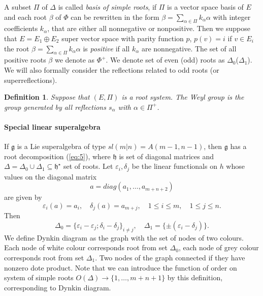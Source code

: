 \documentclass[english]{elsarticle}
\newtheorem{definition}{Definition}[section]
\numberwithin{equation}{section}
\begin{document}
A subset $\Pi$ of $\Delta$ is called {\it basis of simple roots}, if $\Pi$ is a vector space basis of $E$ and each root $\beta$ of $\Phi$ can be rewritten in the form $\beta=\sum\limits_{\alpha \in \Pi}k_{\alpha}\alpha$ with integer coefficients $k_{\alpha}$, that are either all nonnegative or nonpositive. Then we suppose that $E=E_{1}\oplus E_{2}$ super vector space with parity function $p$, $p(v)=i$ if $v\in E_{i}$ the root $\beta=\sum\limits_{\alpha \in \Pi}k_{\alpha}\alpha$ is {\it positive} if all $k_{\alpha}$ are nonnegative.
The set of all positive roots $\beta$ we denote as $\Phi^{+}$. We denote set of even (odd) roots as $\Delta_{0}$($\Delta_{1}$). We will also formally consider the reflections related to odd roots (or superreflections).

\begin{definition}
Suppose that $(E,\Pi)$ is a root system. The {\it Weyl group} is the group generated by all reflections $s_{\alpha}$ with $\alpha \in \Pi^{+}$.\\
\end{definition}


\paragraph{Special linear superalgebra}


If $\mathfrak{g}$ is a Lie superalgebra of type $sl(m|n)=A(m-1,n-1)$, then $\mathfrak{g}$ has a root decomposition (\ref{eq:5}), where $\mathfrak{h}$ is set of diagonal matrices and $\Delta=\Delta_{0}\cup \Delta_{1}\subseteq \mathfrak{h}^{\star}$ set of roots. Let $\varepsilon_i,\delta_j$ be the linear functionals on $h$ whose values on the diagonal matrix
\[
a = diag(a_1,\ldots,a_{m+n+2})
\]
are given by
\begin{equation}
\label{rel:4}
\varepsilon_i(a)=a_i, \quad \delta_j(a)=a_{m+j}, \quad 1\leq i \leq m, \quad 1\leq j \leq n.
\end{equation}
Then
\begin{equation}
\Delta_0=\{\varepsilon_i-\varepsilon_j;\delta_i-\delta_j\}_{i\neq j}, \quad \Delta_1=\{\pm(\varepsilon_i-\delta_j)\}.
\end{equation}
We define Dynkin diagram as the graph with the set of nodes of two colours. Each node of white colour corresponds root from set $\Delta_0$, each node of grey colour corresponds root from set $\Delta_1$. Two nodes of the graph connected if they have nonzero dote product.
Note that we can introduce the function of order on system of simple roots $O(\Delta)\rightarrow \{1,\ldots, m+n+1\}$ by this definition, corresponding to Dynkin diagram.
\end{document}
